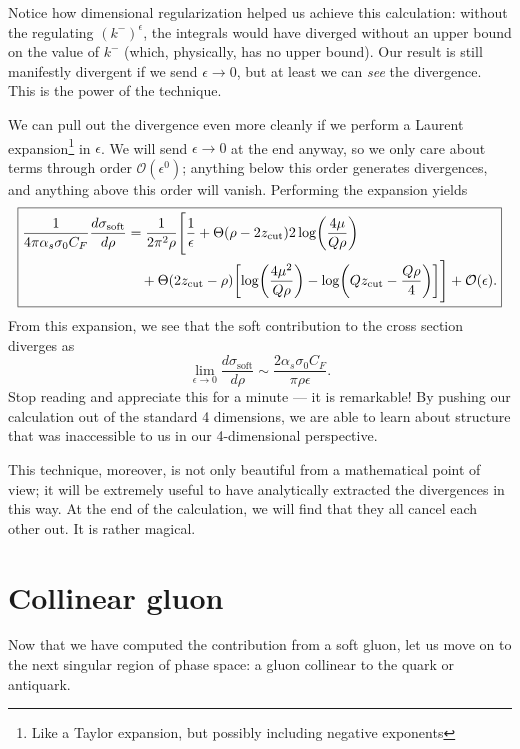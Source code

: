 \documentclass[../thesis.tex]{subfiles}
\providecommand{\zcut}{z_\mathrm{{cut}}}
\providecommand{\cO}{\mathcal{O}}
\begin{document}
	Notice how dimensional regularization helped us achieve this calculation: without the regulating $(k^-)^\epsilon$, the integrals would have diverged without an upper bound on the value of $k^-$ (which, physically, has no upper bound). Our result is still manifestly divergent if we send $\epsilon \to 0$, but at least we can \textit{see} the divergence. This is the power of the technique.

	We can pull out the divergence even more cleanly if we perform a Laurent expansion\footnote{Like a Taylor expansion, but possibly including negative exponents} in $\epsilon$. We will send $\epsilon \to 0$ at the end anyway, so we only care about terms through order $\cO(\epsilon^0)$; anything below this order generates divergences, and anything above this order will vanish. Performing the expansion yields
	\begin{equation}\label{leading-eq:soft result}
	\boxed{
	\begin{aligned}
		\frac{1}{4\pi\alpha_s\sigma_0 C_F}\frac{d\sigma_{\text{soft}}}{d\rho} &= \frac{1}{2\pi^2\rho} \Bigg[\frac{1}{\epsilon} + \Theta(\rho - 2\zcut)2\log(\frac{4\mu}{Q\rho}) \\
			&\quad+ \Theta(2\zcut - \rho)\qty[\log(\frac{4\mu^2}{Q \rho}) - \log(Q \zcut - \frac{Q\rho}{4})]\Bigg] + \cO(\epsilon).
	\end{aligned}
	}
	\end{equation}
	From this expansion, we see that the soft contribution to the cross section diverges as
	\begin{equation}
		\lim_{\epsilon \to 0}\frac{d\sigma_\text{soft}}{d\rho} \sim \frac{2\alpha_s \sigma_0 C_F}{\pi\rho \epsilon}.
	\end{equation}
	Stop reading and appreciate this for a minute --- it is remarkable! By pushing our calculation out of the standard 4 dimensions, we are able to learn about structure that was inaccessible to us in our 4-dimensional perspective. 

	This technique, moreover, is not only beautiful from a mathematical point of view; it will be extremely useful to have analytically extracted the divergences in this way. At the end of the calculation, we will find that they all cancel each other out. It is rather magical.

\section{Collinear gluon}
	Now that we have computed the contribution from a soft gluon, let us move on to the next singular region of phase space: a gluon collinear to the quark or antiquark. 
\end{document}
